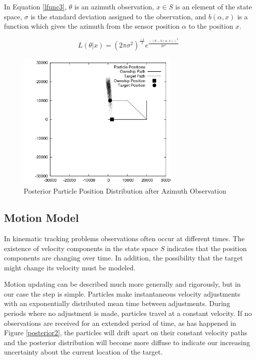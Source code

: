 \documentclass{article}
\begin{document}
In Equation \ref{lfunc3}, \(\theta\) is an azimuth observation, \(x \in S\) is an element of the state space, \(\sigma\) is the standard deviation assigned to the observation, and \(b(\alpha,x)\) is a function which gives the azimuth from the sensor position \(\alpha\) to the position \(x\).

\begin{equation}\label{lfunc3}
L(\theta|x)=(2\pi\sigma^{2})^{\frac{-1}{2}}e^{\frac{-(\theta-b(\alpha,x))^{2}}{2\sigma^{2}}}
\end{equation}

\begin{figure}
\centering
\includegraphics[width=0.7\textwidth]{data/particles_azimuth_obs.png}
\caption{Posterior Particle Position Distribution after Azimuth Observation}
\label{posterior1}
\end{figure}

\subsection{Motion Model}
In kinematic tracking problems observations often occur at different times. The existence of velocity components in the state space \(S\) indicates that the position components are changing over time. In addition, the possibility that the target might change its velocity must be modeled.

Motion updating can be described much more generally and rigorously, but in our case the step is simple. Particles make instantaneous velocity adjustments with an exponentially distributed mean time between adjustments. During periods where no adjustment is made, particles travel at a constant velocity. If no observations are received for an extended period of time, as has happened in Figure \ref{posterior2}, the particles will drift apart on their constant velocity paths and the posterior distribution will become more diffuse to indicate our increasing uncertainty about the current location of the target.
\end{document}
